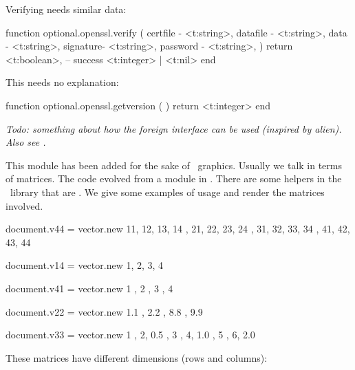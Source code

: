 Verifying needs similar data:

\starttyping[option=LUA]
function optional.openssl.verify (
    {
        certfile - <t:string>,
        datafile - <t:string>,
        data     - <t:string>,
        signature- <t:string>,
        password - <t:string>,
    }
)
    return
        <t:boolean>, -- success
        <t:integer> | <t:nil>
end
\stoptyping

This needs no explanation:

\starttyping[option=LUA]
function optional.openssl.getversion ( )
    return <t:integer>
end
\stoptyping

\stopsubsubsubject

\stopsubsection

\startsubsection[title=Foreign]

{\em Todo: something about how the foreign interface can be used (inspired by
alien). Also see .}

\stopsubsection

\usemodule[matrix]

\startsubsection[title=Vector]


This module has been added for the sake of \METAPOST\ graphics. Usually we talk
in terms of matrices. The code evolved from a module in \CONTEXT. There are some
helpers in the \METAPOST\ library that are . We give some
examples of usage and render the matrices involved.


\startbuffer
\startluacode
document.v44 = vector.new {
    { 11, 12, 13, 14 },
    { 21, 22, 23, 24 },
    { 31, 32, 33, 34 },
    { 41, 42, 43, 44 }
}

document.v14 = vector.new {
    { 1, 2, 3, 4 }
}

document.v41 = vector.new {
    { 1 }, { 2 }, { 3 }, { 4 }
}

document.v22 = vector.new {
    { 1.1 , 2.2 },
    { 8.8 , 9.9 }
}

document.v33 = vector.new {
    { 1 , 2, 0.5 },
    { 3 , 4, 1.0 },
    { 5 , 6, 2.0 }
}
\stopluacode
\stopbuffer

\typebuffer[option=TEX] \getbuffer

These matrices have different dimensions (rows and columns):


